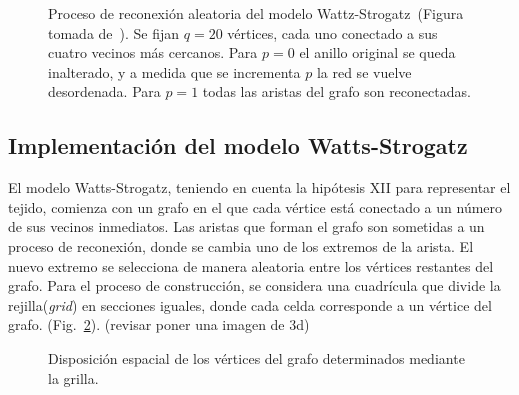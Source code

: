 \begin{figure}[!ht]
\begin{center}
\end{center}\vspace*{-0.6cm}
\caption[Proceso de reconexi\'on aleatoria del modelo Wattz-Strogatz]{Proceso de reconexi\'on aleatoria del modelo Wattz-Strogatz~(Figura tomada de~\cite{complexnetworks}). Se fijan $q = 20$ v\'ertices, cada uno conectado a sus cuatro vecinos m\'as cercanos. Para $p = 0$ el anillo original se queda inalterado, y a medida que se incrementa $p$ la red se vuelve desordenada. Para $p = 1$ todas las aristas del grafo son reconectadas.}
\label{fig-relations}
\end{figure}

\subsection{Implementaci\'on del modelo Watts-Strogatz}
\label{subsec-watts-2}
El modelo Watts-Strogatz, teniendo en cuenta la hipótesis XII para representar el tejido, comienza con un grafo en el que cada vértice está conectado a un número de sus vecinos inmediatos. Las aristas que forman el grafo son sometidas a un proceso de reconexión, donde se cambia uno de los extremos de la arista. El nuevo extremo se selecciona de manera aleatoria entre los vértices restantes del grafo. Para el proceso de construcción, se considera una cuadrícula que divide la rejilla(\textit{grid}) en secciones iguales, donde cada celda corresponde a un vértice del grafo. (Fig.~\ref{fig-grid-3D-initial}). (revisar poner una imagen de 3d)

\begin{figure}[!ht]
\begin{center}
\end{center}\vspace*{-0.6cm}
\caption[Disposici\'on espacial de los v\'ertices del grafo]{Disposici\'on espacial de los v\'ertices del grafo determinados mediante la grilla.}
\label{fig-grid-3D-initial}
\end{figure}

